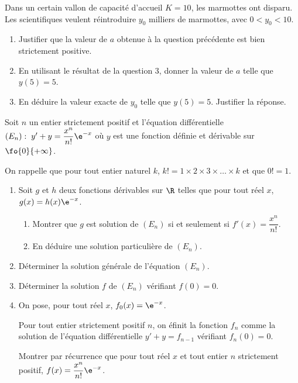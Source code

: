 \begin{exercice_cours}[\quad]{}
\medskip

Dans un certain vallon de capacité d'accueil $K=10$, les marmottes ont disparu. Les scientifiques veulent réintroduire $y_0$ milliers de marmottes, avec $0<y_0<10$.

\begin{enumerate}[series=B, resume]
	\item Justifier que la valeur de $a$ obtenue à la question précédente est bien strictement positive.
	\item En utilisant le résultat de la question 3, donner la valeur de $a$ telle que $y(5)=5$.
	\item En déduire la valeur exacte de $y_0$ telle que $y(5)=5$. Justifier la réponse.
\end{enumerate}

\end{exercice_cours}

\pagebreak

\begin{exercice_cours}[\quad]{}

	Soit $n$ un entier strictement positif et l'équation différentielle $(E_n):\; y'+y=\dfrac{x^n}{n!}\e^{-x}$ où $y$ est une fonction définie et dérivable sur $\fo{0}{+\infty}$.

	On rappelle que pour tout entier naturel $k$, $k!=1\times 2\times 3\times \dots \times k$ et que $0!=1$.

\begin{enumerate}[series=C]
	\item Soit $g$ et $h$ deux fonctions dérivables sur $\R$ telles que pour tout réel $x$, $g(x)=h(x)\e^{-x}$.

	\begin{enumerate}
		\item Montrer que $g$ est solution de $(E_n)$ si et seulement si $f'(x)=\dfrac{x^n}{n!}$.
		\item En déduire une solution particulière de $(E_n)$.
	\end{enumerate}

	\item Déterminer la solution générale de l'équation $(E_n)$.
	\item Déterminer la solution $f$ de $(E_n)$ vérifiant $f(0)=0$. 
	\item On pose, pour tout réel $x$, $f_0(x)=\e^{-x}$.
	
	Pour tout entier strictement positif $n$, on éfinit la fonction $f_n$ comme la solution de l'équation différentielle $y'+y=f_{n-1}$ vérifiant $f_n(0)=0$.

	Montrer par récurrence que pour tout réel $x$ et tout entier $n$ strictement positif, $f(x)=\dfrac{x^n}{n!}\e^{-x}$.
\end{enumerate}


\end{exercice_cours}


